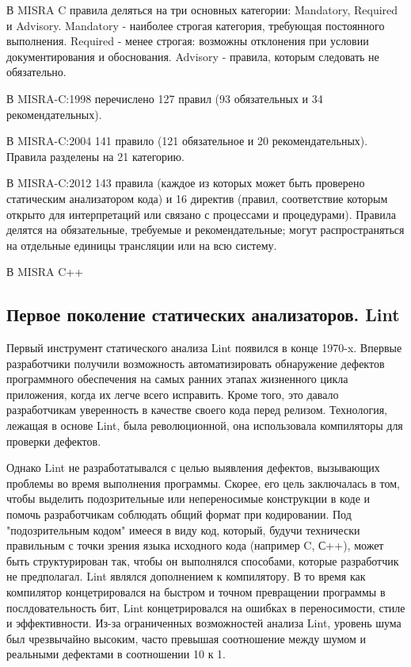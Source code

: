 В MISRA C правила деляться на три основных категории: Mandatory, Required и Advisory. Mandatory -
наиболее строгая категория, требующая постоянного выполнения. Required - менее строгая: возможны 
отклонения при условии документирования и обоснования. Advisory - правила, которым следовать 
не обязательно.

В MISRA-C:1998 перечислено 127 правил (93 обязательных и 34 рекомендательных).

В MISRA-C:2004 141 правило (121 обязательное и 20 рекомендательных). Правила разделены на 21 категорию.

В MISRA-C:2012 143 правила (каждое из которых может быть проверено статическим анализатором кода) и 16 директив 
(правил, соответствие которым открыто для интерпретаций или связано с процессами и процедурами). Правила делятся 
на обязательные, требуемые и рекомендательные; могут распространяться на отдельные единицы трансляции или на всю 
систему.

В MISRA C++ 


\subsection{}

\subsection{Первое поколение статических анализаторов. Lint}

Первый инструмент статического анализа Lint появился в конце 1970-x. Впервые разработчики 
получили возможность автоматизировать обнаружение дефектов программного обеспечения на самых 
ранних этапах жизненного цикла приложения, когда их легче всего исправить. Кроме того, это 
давало разработчикам уверенность в качестве своего кода перед релизом. Технология, лежащая в 
основе Lint, была революционной, она использовала компиляторы для проверки дефектов. 

Однако Lint не разработатывался с целью выявления дефектов, вызывающих проблемы во 
время выполнения программы. Скорее, его цель заключалась в том, чтобы выделить подозрительные 
или непереносимые конструкции в коде и помочь разработчикам соблюдать общий формат при 
кодировании. Под "подозрительным кодом" имееся в виду код, который, будучи технически правильным 
с точки зрения языка исходного кода (например C, С++), может быть структурирован так, чтобы он 
выполнялся способами, которые разработчик не предполагал. Lint являлся дополнением к компилятору. В то время как  компилятор концетрировался на быстром и точном превращении программы в послдовательность бит, Lint концетрировался на ошибках в переносимости, стиле и эффективности.
Из-за ограниченных возможностей анализа Lint, уровень шума был чрезвычайно высоким, часто превышая соотношение между шумом и реальными дефектами в соотношении 10 к 1.

